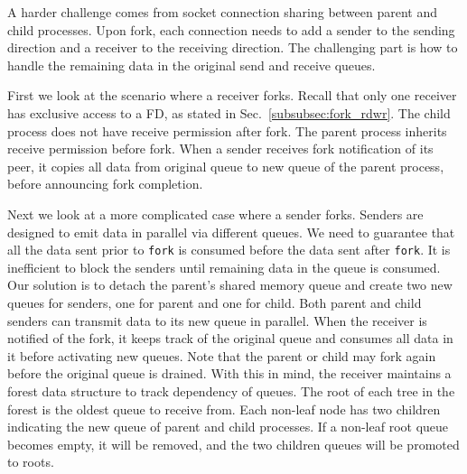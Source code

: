 A harder challenge comes from socket connection sharing between parent and child processes. Upon fork, each connection needs to add a sender to the sending direction and a receiver to the receiving direction. The challenging part is how to handle the remaining data in the original send and receive queues.



First we look at the scenario where a receiver forks. Recall that only one receiver has exclusive access to a FD, as stated in Sec.~\ref{subsubsec:fork_rdwr}. The child process does not have receive permission after fork. The parent process inherits receive permission before fork. When a sender receives fork notification of its peer, it copies all data from original queue to new queue of the parent process, before announcing fork completion.

Next we look at a more complicated case where a sender forks. Senders are designed to emit data in parallel via different queues. We need to guarantee that all the data sent prior to \texttt{fork} is consumed before the data sent after \texttt{fork}. It is inefficient to block the senders until remaining data in the queue is consumed.
Our solution is to detach the parent's shared memory queue and create two new queues for senders, one for parent and one for child. Both parent and child senders can transmit data to its new queue in parallel. When the receiver is notified of the fork, it keeps track of the original queue and consumes all data in it before activating new queues. Note that the parent or child may fork again before the original queue is drained. With this in mind, the receiver maintains a forest data structure to track dependency of queues. The root of each tree in the forest is the oldest queue to receive from. Each non-leaf node has two children indicating the new queue of parent and child processes. If a non-leaf root queue becomes empty, it will be removed, and the two children queues will be promoted to roots.

